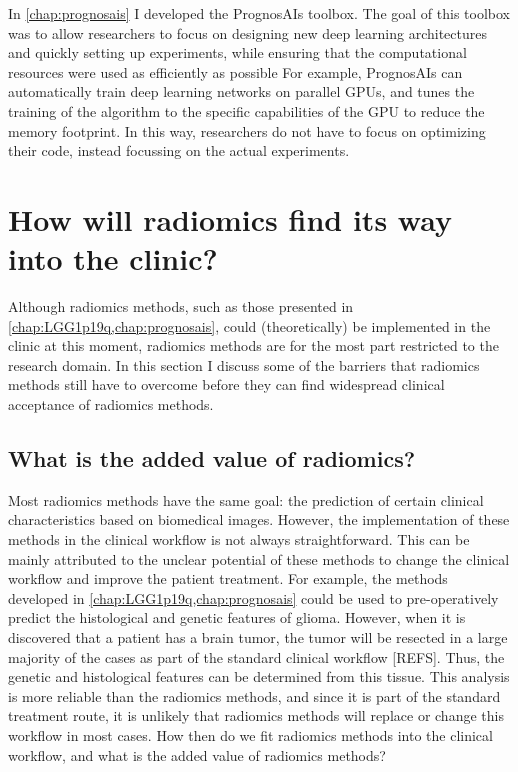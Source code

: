 In \cref{chap:prognosais} I developed the PrognosAIs toolbox.
The goal of this toolbox was to allow researchers to focus on designing new deep learning architectures and quickly setting up experiments, while ensuring that the computational resources were used as efficiently as possible
For example, PrognosAIs can automatically train deep learning networks on parallel GPUs, and tunes the training of the algorithm to the specific capabilities of the GPU to reduce the memory footprint.
In this way, researchers do not have to focus on optimizing their code, instead focussing on the actual experiments.



\section{How will radiomics find its way into the clinic?}\label{sec:discussion_clinical}

Although radiomics methods, such as those presented in \cref{chap:LGG1p19q,chap:prognosais}, could (theoretically) be implemented in the clinic at this moment, radiomics methods are for the most part restricted to the research domain.
In this section I discuss some of the barriers that radiomics methods still have to overcome before they can find widespread clinical acceptance of radiomics methods.

\subsection{What is the added value of radiomics?}\label{subsec:discussion_added_value_radiomics}

Most radiomics methods have the same goal: the prediction of certain clinical characteristics based on biomedical images.
However, the implementation of these methods in the clinical workflow is not always straightforward.
This can be mainly attributed to the unclear potential of these methods to change the clinical workflow and improve the patient treatment.
For example, the methods developed in \cref{chap:LGG1p19q,chap:prognosais} could be used to pre-operatively predict the histological and genetic features of glioma.
However, when it is discovered that a patient has a brain \gls{tumor}, the tumor will be resected in a large majority of the cases as part of the standard clinical workflow [REFS].
Thus, the genetic and histological features can be determined from this tissue.
This analysis is more reliable than the radiomics methods, and since it is part of the standard treatment route, it is unlikely that radiomics methods will replace or change this workflow in most cases.
How then do we fit radiomics methods into the clinical workflow, and what is the added value of radiomics methods?

